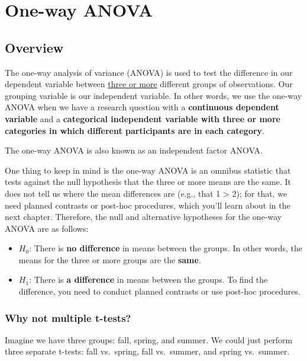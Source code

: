 \documentclass[
]{book}
\providecommand{\tightlist}{%
  \setlength{\itemsep}{0pt}\setlength{\parskip}{0pt}}
\begin{document}
\hypertarget{one-way-anova}{%
\section{One-way ANOVA}\label{one-way-anova}}

\hypertarget{overview-6}{%
\subsection{Overview}\label{overview-6}}

The one-way analysis of variance (ANOVA) is used to test the difference in our dependent variable between \underline{three or more} different groups of observations. Our grouping variable is our independent variable. In other words, we use the one-way ANOVA when we have a research question with a \textbf{continuous dependent variable} and a \textbf{categorical independent variable with three or more categories in which different participants are in each category}.

The one-way ANOVA is also known as an independent factor ANOVA.

One thing to keep in mind is the one-way ANOVA is an omnibus statistic that tests against the null hypothesis that the three or more means are the same. It does not tell us where the mean differences are (e.g., that 1 \textgreater{} 2); for that, we need planned contrasts or post-hoc procedures, which you'll learn about in the next chapter. Therefore, the null and alternative hypotheses for the one-way ANOVA are as follows:

\begin{itemize}
\tightlist
\item
  \(H_0\): There is \textbf{no difference} in means between the groups. In other words, the means for the three or more groups are the \textbf{same}.
\item
  \(H_1\): There is \textbf{a difference} in means between the groups. To find the difference, you need to conduct planned contrasts or use post-hoc procedures.
\end{itemize}

\hypertarget{why-not-multiple-t-tests}{%
\subsubsection{Why not multiple t-tests?}\label{why-not-multiple-t-tests}}

Imagine we have three groups: fall, spring, and summer. We could just perform three separate t-tests: fall vs.~spring, fall vs.~summer, and spring vs.~summer.
\end{document}
